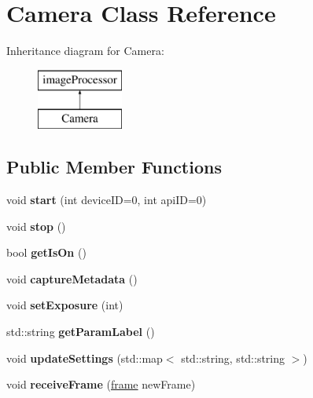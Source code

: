 \hypertarget{class_camera}{}\section{Camera Class Reference}
\label{class_camera}
Inheritance diagram for Camera\+:\begin{figure}[H]
\begin{center}
\leavevmode
\includegraphics[height=2.000000cm]{class_camera}
\end{center}
\end{figure}
\subsection*{Public Member Functions}
\begin{DoxyCompactItemize}
\item 
void {\bfseries start} (int device\+ID=0, int api\+ID=0)\hypertarget{class_camera_a3cd0cd6f746715260f64551803379883}{}\label{class_camera_a3cd0cd6f746715260f64551803379883}

\item 
void {\bfseries stop} ()\hypertarget{class_camera_ae6c6aeaf70ad261f3c188c50e8701b0b}{}\label{class_camera_ae6c6aeaf70ad261f3c188c50e8701b0b}

\item 
bool {\bfseries get\+Is\+On} ()\hypertarget{class_camera_a83396433ca6457173dc1844152715de2}{}\label{class_camera_a83396433ca6457173dc1844152715de2}

\item 
void {\bfseries capture\+Metadata} ()\hypertarget{class_camera_a974535be48b49903ad17d3fd456c6b1c}{}\label{class_camera_a974535be48b49903ad17d3fd456c6b1c}

\item 
void {\bfseries set\+Exposure} (int)\hypertarget{class_camera_aff550113223c8cb6f9c3dcead5dce65b}{}\label{class_camera_aff550113223c8cb6f9c3dcead5dce65b}

\item 
std\+::string {\bfseries get\+Param\+Label} ()\hypertarget{class_camera_a9bc9cf6296523cdb0c6e1b7c7b8de1e0}{}\label{class_camera_a9bc9cf6296523cdb0c6e1b7c7b8de1e0}

\item 
void {\bfseries update\+Settings} (std\+::map$<$ std\+::string, std\+::string $>$)\hypertarget{class_camera_ae6c8345e9a3b08dd698058db6d858ca2}{}\label{class_camera_ae6c8345e9a3b08dd698058db6d858ca2}

\item 
void {\bfseries receive\+Frame} (\hyperlink{classframe}{frame} new\+Frame)\hypertarget{class_camera_ab49cc3479fe3a8aee5964a560af918ea}{}\label{class_camera_ab49cc3479fe3a8aee5964a560af918ea}

\end{DoxyCompactItemize}

